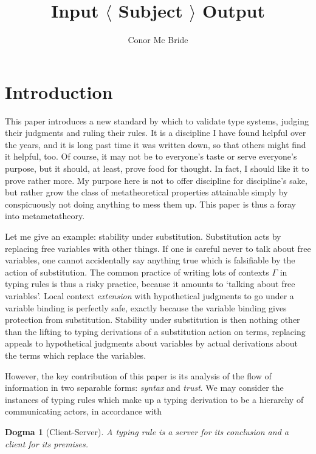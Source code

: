 \documentclass[format=acmsmall, screen, review, anonymous, timestamp]{acmart}
\newtheorem{dog}[thm]{Dogma}
\begin{document}
\title{Input $\langle$ Subject $\rangle$ Output}
\author{Conor Mc Bride}
\maketitle

\section{Introduction\label{sec:intro}}

This paper introduces a new standard by which to validate type
systems, judging their judgments and ruling their rules. It is a
discipline I have found helpful over the years, and it is long past
time it was written down, so that others might find it helpful,
too. Of course, it may not be to everyone's taste or serve everyone's
purpose, but it should, at least, prove food for thought. In fact, I
should like it to prove rather more. My purpose here is not to offer
discipline for discipline's sake, but rather grow the class of
metatheoretical properties attainable simply by conspicuously not
doing anything to mess them up. This paper is thus a foray into
metametatheory.

Let me give an example: stability under substitution. Substitution
acts by replacing free variables with other things. If one is careful
never to talk about free variables, one cannot accidentally say
anything true which is falsifiable by the action of substitution. The
common practice of writing lots of contexts $\Gamma$ in typing rules
is thus a risky practice, because it amounts to `talking about free
variables'. Local context \emph{extension} with hypothetical judgments
to go under a variable binding is perfectly safe, exactly because the
variable binding gives protection from substitution. Stability under
substitution is then nothing other than the lifting to typing
derivations of a substitution action on terms, replacing appeals to
hypothetical judgments about variables by actual derivations about the
terms which replace the variables.

However, the key contribution of this paper is its analysis of the
flow of information in two separable forms: \emph{syntax} and
\emph{trust}. We may consider the instances of typing rules which make
up a typing derivation to be a hierarchy of communicating actors, in
accordance with

\begin{dog}[Client-Server]
  A typing rule is a server for its conclusion and a client for its premises.
\end{dog}
\end{document}
